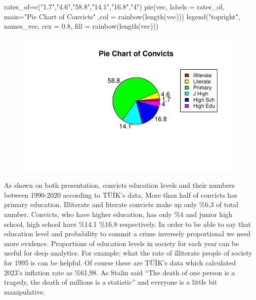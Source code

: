 \documentclass[
  11pt,
  a4paper,
  DIV=11,
  numbers=noendperiod]{scrartcl}
\newenvironment{Shaded}{\begin{snugshade}}{\end{snugshade}}
\newcommand{\AttributeTok}[1]{\textcolor[rgb]{0.40,0.45,0.13}{#1}}
\newcommand{\FloatTok}[1]{\textcolor[rgb]{0.68,0.00,0.00}{#1}}
\newcommand{\FunctionTok}[1]{\textcolor[rgb]{0.28,0.35,0.67}{#1}}
\newcommand{\NormalTok}[1]{\textcolor[rgb]{0.00,0.23,0.31}{#1}}
\newcommand{\OtherTok}[1]{\textcolor[rgb]{0.00,0.23,0.31}{#1}}
\newcommand{\StringTok}[1]{\textcolor[rgb]{0.13,0.47,0.30}{#1}}
\begin{document}
\begin{Shaded}
\begin{Highlighting}[]
\NormalTok{rates\_of}\OtherTok{=}\FunctionTok{c}\NormalTok{(}\StringTok{"1.7"}\NormalTok{,}\StringTok{"4.6"}\NormalTok{,}\StringTok{"58.8"}\NormalTok{,}\StringTok{"14.1"}\NormalTok{,}\StringTok{"16.8"}\NormalTok{,}\StringTok{"4"}\NormalTok{)}
\FunctionTok{pie}\NormalTok{(vec, }\AttributeTok{labels =}\NormalTok{ rates\_of, }\AttributeTok{main=}\StringTok{"Pie Chart of Convicts"}\NormalTok{ ,}\AttributeTok{col =} \FunctionTok{rainbow}\NormalTok{(}\FunctionTok{length}\NormalTok{(vec)))}
\FunctionTok{legend}\NormalTok{(}\StringTok{"topright"}\NormalTok{, names\_vec, }\AttributeTok{cex =} \FloatTok{0.8}\NormalTok{,}
   \AttributeTok{fill =} \FunctionTok{rainbow}\NormalTok{(}\FunctionTok{length}\NormalTok{(vec)))}
\end{Highlighting}
\end{Shaded}

\begin{figure}[H]

{\centering \includegraphics{analysis_files/figure-pdf/unnamed-chunk-8-1.pdf}

}

\end{figure}

As shown on both presentation, convicts education levels and their
numbers between 1990-2020 according to TÜİK's data, More than half of
convicts has primary education. Illiterate and literate convicts make up
only \%6,3 of total number. Convicts, who have higher education, has
only \%4 and junior high school, high school have \%14.1 \%16.8
respectively. In order to be able to say that education level and
probability to commit a crime inversely proportional we need more
evidence. Proportions of education levels in society for each year can
be useful for deep analytics. For example; what the rate of illiterate
people of society for 1995 is can be helpful. Of course these are TÜİK's
data which calculated 2023's inflation rate as \%61,98. As Stalin said
``The death of one person is a tragedy, the death of millions is a
statistic'' and everyone is a little bit manipulative.
\end{document}

